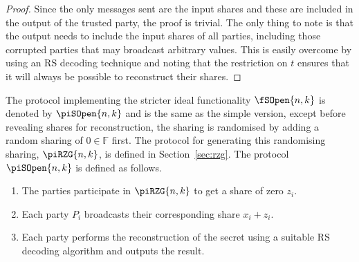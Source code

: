 \documentclass{article}
\theoremstyle{remark}
\newcommand{\F}{\mathbb{F}}
\begin{document}
\begin{proof}
	Since the only messages sent are the input shares and these are included in
	the output of the trusted party, the proof is trivial. The only thing to
	note is that the output needs to include the input shares of all parties,
	including those corrupted parties that may broadcast arbitrary values. This
	is easily overcome by using an RS decoding technique and noting that the
	restriction on $t$ ensures that it will always be possible to reconstruct
	their shares.
\end{proof}

The protocol implementing the stricter ideal functionality $\fSOpen{n,k}$ is
denoted by $\piSOpen{n,k}$ and is the same as the simple version, except before
revealing shares for reconstruction, the sharing is randomised by adding a
random sharing of $0 \in \F$ first. The protocol for generating this
randomising sharing, $\piRZG{n,k}$, is defined in Section~\ref{sec:rzg}. The
protocol $\piSOpen{n,k}$ is defined as follows.

\begin{enumerate}
	\item The parties participate in $\piRZG{n,k}$ to get a share of zero
		$z_i$.

	\item Each party $P_i$ broadcasts their corresponding share $x_i + z_i$.

	\item Each party performs the reconstruction of the secret using a suitable
		RS decoding algorithm and outputs the result.
\end{enumerate}
\end{document}
